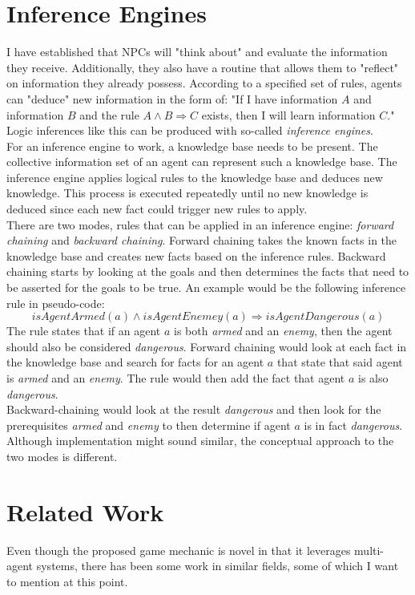 \section{Inference Engines}
I have established that NPCs will "think about" and evaluate the information they receive. Additionally, they also have a routine that allows them to "reflect" on information they already possess. According to a specified set of rules, agents can "deduce" new information in the form of: "If I have information $A$ and information $B$ and the rule $A \wedge B \Rightarrow C$ exists, then I will learn information $C$." Logic inferences like this can be produced with so-called \textit{inference engines}.~\cite{Hayes1983}\\
For an inference engine to work, a knowledge base needs to be present. The collective information set of an agent can represent such a knowledge base. The inference engine applies logical rules to the knowledge base and deduces new knowledge. This process is executed repeatedly until no new knowledge is deduced since each new fact could trigger new rules to apply.\\
There are two modes, rules that can be applied in an inference engine: \textit{forward chaining} and \textit{backward chaining}. Forward chaining takes the known facts in the knowledge base and creates new facts based on the inference rules. Backward chaining starts by looking at the goals and then determines the facts that need to be asserted for the goals to be true. An example would be the following inference rule in pseudo-code:
\begin{equation}
	\textit{isAgentArmed}(a) \wedge \textit{isAgentEnemey}(a) \Rightarrow \textit{isAgentDangerous}(a)
\end{equation}
The rule states that if an agent $a$ is both \textit{armed} and an \textit{enemy}, then the agent should also be considered \textit{dangerous}. Forward chaining would look at each fact in the knowledge base and search for facts for an agent $a$ that state that said agent is \textit{armed} and an \textit{enemy}. The rule would then add the fact that agent $a$ is also \textit{dangerous}.\\
Backward-chaining would look at the result \textit{dangerous} and then look for the prerequisites \textit{armed} and \textit{enemy} to then determine if agent $a$ is in fact \textit{dangerous}. Although implementation might sound similar, the conceptual approach to the two modes is different.~\cite{Feigenbaum1981}
\section{Related Work}
Even though the proposed game mechanic is novel in that it leverages multi-agent systems, there has been some work in similar fields, some of which I want to mention at this point.
